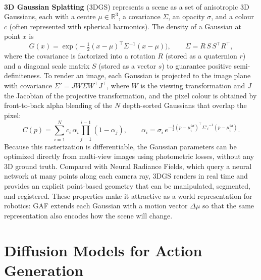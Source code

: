 \documentclass[12pt,a4paper,final]{extreport}
\begin{document}
\paragraph{} \textbf{3D Gaussian Splatting} (3DGS) \cite{kerbl2023} represents a scene as a set of anisotropic 3D Gaussians, each with a centre $\mu\in\mathbb{R}^3$, a covariance $\Sigma$, an opacity $\sigma$, and a colour $c$ (often represented with spherical harmonics). The density of a Gaussian at point $x$ is
\begin{equation}
G(x)=\exp\!\Big(-\tfrac{1}{2}(x-\mu)^{\top}\Sigma^{-1}(x-\mu)\Big),\qquad \Sigma = R\,S\,S^{\top}R^{\top},
\label{eq:gauss}
\end{equation}
where the covariance is factorized into a rotation $R$ (stored as a quaternion $r$) and a diagonal scale matrix $S$ (stored as a vector $s$) to guarantee positive semi-definiteness. To render an image, each Gaussian is projected to the image plane with covariance $\Sigma' = J W \Sigma W^{\top} J^{\top}$, where $W$ is the viewing transformation and $J$ the Jacobian of the projective transformation, and the pixel colour is obtained by front-to-back alpha blending of the $N$ depth-sorted Gaussians that overlap the pixel:
\begin{equation}
C(p)=\sum_{i=1}^{N} c_i\,\alpha_i \prod_{j=1}^{i-1}(1-\alpha_j),\qquad \alpha_i=\sigma_i\, e^{-\frac{1}{2}(p-\mu^{2d}_i)^{\top}{\Sigma'_i}^{-1}(p-\mu^{2d}_i)}.
\label{eq:alphablend}
\end{equation}
Because this rasterization is differentiable, the Gaussian parameters can be optimized directly from multi-view images using photometric losses, without any 3D ground truth. Compared with Neural Radiance Fields, which query a neural network at many points along each camera ray, 3DGS renders in real time and provides an explicit point-based geometry that can be manipulated, segmented, and registered. These properties make it attractive as a world representation for robotics: GAF \cite{p2} extends each Gaussian with a motion vector $\Delta\mu$ so that the same representation also encodes how the scene will change.

\section{Diffusion Models for Action Generation}
\end{document}
